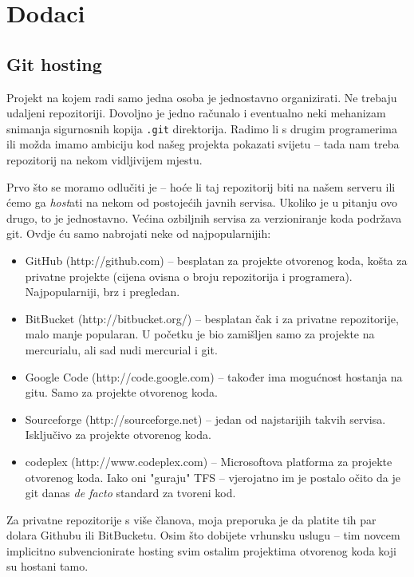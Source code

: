\chapter*{Dodaci}

\section*{Git hosting}

Projekt na kojem radi samo jedna osoba je jednostavno organizirati. 
Ne trebaju udaljeni repozitoriji.
Dovoljno je jedno računalo i eventualno neki mehanizam snimanja sigurnosnih kopija \verb+.git+ direktorija.
Radimo li s drugim programerima ili možda imamo ambiciju kod našeg projekta pokazati svijetu -- tada nam treba repozitorij na nekom vidljivijem mjestu.

Prvo što se moramo odlučiti je -- hoće li taj repozitorij biti na našem serveru ili ćemo ga \emph{host}ati na nekom od postojećih javnih servisa.
Ukoliko je u pitanju ovo drugo, to je jednostavno.
Većina ozbiljnih servisa za verzioniranje koda podržava git.
Ovdje ću samo nabrojati neke od najpopularnijih:

\begin{itemize}
    \item GitHub (http://github.com) -- besplatan za projekte otvorenog koda, košta za privatne projekte (cijena ovisna o broju repozitorija i programera). Najpopularniji, brz i pregledan.
    \item BitBucket (http://bitbucket.org/) -- besplatan čak i za privatne repozitorije, malo manje popularan. U početku je bio zamišljen samo za projekte na mercurialu, ali sad nudi mercurial i git.
    \item Google Code (http://code.google.com) -- također ima mogućnost hostanja na gitu. Samo za projekte otvorenog koda.
    \item Sourceforge (http://sourceforge.net) -- jedan od najstarijih takvih servisa. Isključivo za projekte otvorenog koda.
    \item codeplex (http://www.codeplex.com) -- Microsoftova platforma za projekte otvorenog koda. Iako oni "guraju" TFS -- vjerojatno im je postalo očito da je git danas \emph{de facto} standard za tvoreni kod.
\end{itemize}

Za privatne repozitorije s više članova, moja preporuka je da platite tih par dolara Githubu ili BitBucketu. 
Osim što dobijete vrhunsku uslugu -- tim novcem implicitno subvencionirate hosting svim ostalim projektima otvorenog koda koji su hostani tamo.

